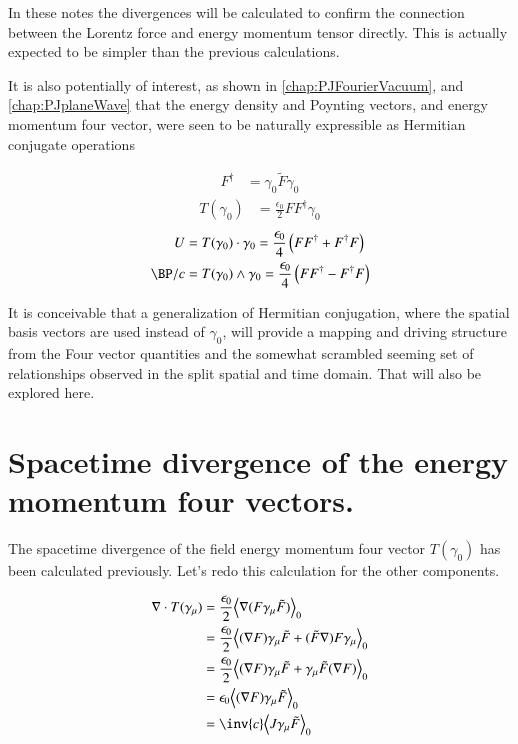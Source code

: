 In these notes the divergences will be calculated to confirm the
connection between the Lorentz force and energy momentum tensor directly.
This is actually expected to be simpler than the previous calculations.

It is also 
potentially of interest, as shown in \ref{chap:PJFourierVacuum}, and
\ref{chap:PJplaneWave}
that the energy density and Poynting vectors, and energy momentum four vector,
were seen to be naturally expressible as Hermitian conjugate operations

\begin{align}
F^\dagger &= \gamma_0 \tilde{F} \gamma_0
\end{align}
\begin{align}
T(\gamma_0) &= \frac{\epsilon_0}{2} F F^\dagger \gamma_0
\end{align}
\begin{align}
U &= T(\gamma_0) \cdot \gamma_0 = \frac{\epsilon_0}{4} \left(F F^\dagger + F^\dagger F \right) \\
\BP/c &= T(\gamma_0) \wedge \gamma_0 = \frac{\epsilon_0}{4} \left(F F^\dagger - F^\dagger F \right)
\end{align}

It is conceivable that a generalization of Hermitian conjugation, where the spatial basis vectors are used instead of $\gamma_0$, will 
provide a mapping and driving structure from the Four vector quantities and the somewhat scrambled seeming set
of relationships observed in the split spatial and time domain.  That will also be explored here.

\section{Spacetime divergence of the energy momentum four vectors. }

The spacetime divergence of the field energy momentum four vector $T(\gamma_0)$ has been calculated previously.  Let's redo this 
calculation for the other components.

\begin{align*}
\grad \cdot T(\gamma_\mu) 
&= \frac{\epsilon_0}{2} \gpgradezero{ \grad (F \gamma_\mu \tilde{F}) } \\
&= \frac{\epsilon_0}{2} \gpgradezero{ (\grad F) \gamma_\mu \tilde{F} + (\tilde{F} \grad) F \gamma_\mu } \\
&= \frac{\epsilon_0}{2} \gpgradezero{ (\grad F) \gamma_\mu \tilde{F} + \gamma_\mu \tilde{F} (\grad F) } \\
&= {\epsilon_0} \gpgradezero{ (\grad F) \gamma_\mu \tilde{F} } \\
&= \inv{c} \gpgradezero{ J \gamma_\mu \tilde{F} } \\
\end{align*}

